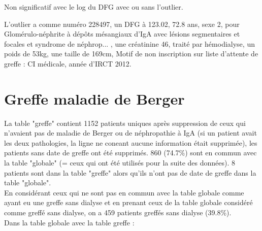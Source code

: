 \documentclass[11pt,a4paper]{article}\usepackage[]{graphicx}\usepackage[]{color}
\begin{document}
Non significatif avec le log du DFG avec ou sans l'outlier.

L'outlier a comme numéro 228497, un DFG à 123.02, 72.8 ans, sexe 2, pour Glomérulo-néphrite à dépôts mésangiaux d'IgA avec lésions segmentaires et focales et syndrome de néphrop... , une créatinine 46, traité par hémodialyse, un poids de 53kg, une taille de 169cm, Motif de non inscription sur liste d'attente de greffe : CI médicale, année d'IRCT 2012.

  
\section{Greffe maladie de Berger}




La table "greffe" contient 1152 patients uniques après suppression de ceux qui n'avaient pas de maladie de Berger ou de néphropathie à IgA (si un patient avait les deux pathologies, la ligne ne coneant aucune information était supprimée), les patients sans date de greffe ont été supprimés. 860 (74.7\%) sont en commun avec la table "globale" (= ceux qui ont été utilisés pour la suite des données). 8 patients sont dans la table "greffe" alors qu'ils n'ont pas de date de greffe dans la table "globale".
~\\

En considérant ceux qui ne sont pas en commun avec la table globale comme ayant eu une greffe sans dialyse et en prenant ceux de la table globale considéré comme greffé sans dialyse, on a 459 patients greffés sans dialyse (39.8\%).
~\\

Dans la table globale avec la table greffe :
\end{document}

